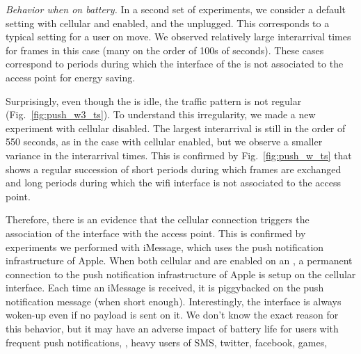 

\noindent\emph{Behavior when on battery.} 
In a second set of experiments, we consider a default \iphone{}
setting with cellular and \wifi{} enabled, and the \iphone{} unplugged. This
corresponds to a typical setting for a user on move.  We observed 
relatively large interarrival times for frames in this case (many on the order of 100s of 
seconds). These cases correspond to
periods during which the \wifi interface of the \iphone{} is not
associated to the access point for energy saving. 




Surprisingly, even though the \iphone{} is idle, the traffic pattern
is not regular (Fig.~\ref{fig:push_w3_ts}). To
understand this irregularity, we made a new experiment with cellular
disabled. The largest
interarrival is still in the order of 550 seconds, as in the case with
cellular enabled, but we observe a smaller variance in the interarrival times. This
is confirmed by Fig.~\ref{fig:push_w_ts} that shows a regular
succession of short periods during which frames are exchanged and long
periods during which the wifi interface is not associated to the
access point.



Therefore, there is an evidence that the cellular connection triggers
the association of the \iphone{} \wifi interface with the access
point. This is confirmed by experiments we performed with iMessage, 
which uses the push notification infrastructure of Apple. When both
cellular and \wifi{} are enabled on an \iphone{}, a permanent connection to
the push notification infrastructure of Apple is setup on the cellular
interface. Each time an iMessage is received, it is piggybacked on the
push notification message (when short enough). Interestingly, the \wifi{}
interface is always woken-up even if no payload is sent on it. We
don't know the exact reason for this behavior, but it may have an
adverse impact of battery life for users with frequent push
notifications, \eg, heavy users of SMS, twitter, facebook, games, \etc



